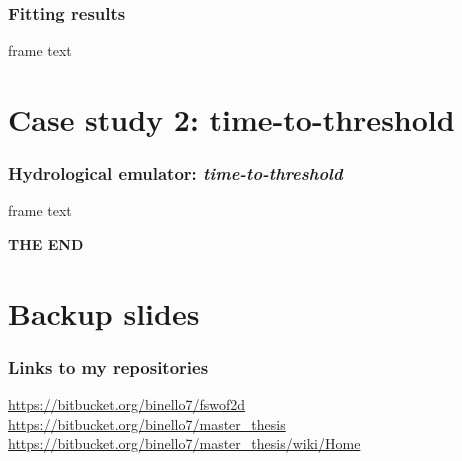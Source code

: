 \documentclass[xcolor=dvipsnames, USenglish]{beamer}  %
\begin{document}
  \begin{frame}
    \frametitle{Fitting results}
    frame text
  \end{frame}






\section{Case study 2: time-to-threshold}

  \begin{frame}
    \frametitle{Hydrological emulator: \emph{time-to-threshold}}
    frame text
  \end{frame}



  {
  \begin{frame}[plain]
    \centering
    \Large{\textbf{THE END}}\\
  \end{frame}
  }



\section{Backup slides}
  \begin{frame}
    \frametitle{Links to my repositories}
    \small{\url{https://bitbucket.org/binello7/fswof2d}}\\
    \small{\url{https://bitbucket.org/binello7/master_thesis}}\\
    \small{\url{https://bitbucket.org/binello7/master_thesis/wiki/Home}}
  \end{frame}

\end{document}
